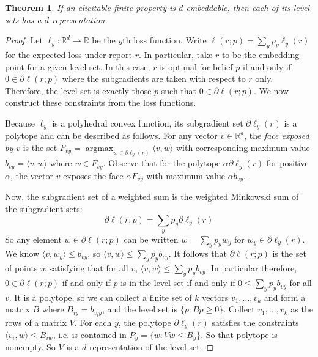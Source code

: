 \documentclass[12pt]{article}
\newtheorem{theorem}{Theorem}
\theoremstyle{definition}
\DeclareMathOperator*{\argmax}{\textrm{argmax}}
\newcommand{\reals}{\mathbb{R}}
\begin{document}
\begin{theorem}
  If an elicitable finite property is $d$-embeddable, then each of its level sets has a $d$-representation.
\end{theorem}
\begin{proof}
  Let $\ell_y: \reals^d \to \reals$ be the $y$th loss function.
  Write $\ell(r;p) = \sum_y p_y \ell_y(r)$ for the expected loss under report $r$.
  In particular, take $r$ to be the embedding point for a given level set.
  In this case, $r$ is optimal for belief $p$ if and only if $0 \in \partial \ell(r;p)$ where the subgradients are taken with respect to $r$ only.
  Therefore, the level set is exactly those $p$ such that $0 \in \partial \ell(r;p)$.
  We now construct these constraints from the loss functions.

  Because $\ell_y$ is a polyhedral convex function, its subgradient set $\partial \ell_y(r)$ is a polytope and can be described as follows.
  For any vector $v \in \reals^d$, the \emph{face exposed by $v$} is the set $F_{vy} = \argmax_{w \in \partial \ell_y(r)} \langle v, w \rangle$ with corresponding maximum value $b_{vy} = \langle v, w \rangle$ where $w \in F_{vy}$.
  Observe that for the polytope $\alpha \partial \ell_y(r)$ for positive $\alpha$, the vector $v$ exposes the face $\alpha F_{vy}$ with maximum value $\alpha b_{vy}$.

  Now, the subgradient set of a weighted sum is the weighted Minkowski sum of the subgradient sets:
    \[ \partial \ell(r;p) = \sum_y p_y \partial \ell_y(r) \]
  So any element $w \in \partial \ell(r;p)$ can be written $w = \sum_y p_y w_y$ for $w_y \in \partial \ell_y(r)$.
  We know $\langle v , w_y \rangle \leq b_{vy}$, so $\langle v, w \rangle \leq \sum_y p_y b_{vy}$.
  It follows that $\partial \ell(r;p)$ is the set of points $w$ satisfying that for all $v$, $\langle v,w \rangle \leq \sum_y p_y b_{vy}$.
  In particular therefore, $0 \in \partial \ell(r;p)$ if and only if $p$ is in the level set if and only if $0 \leq \sum_y p_y b_{vy}$ for all $v$.
  It is a polytope, so we can collect a finite set of $k$ vectors $v_1,\dots,v_k$ and form a matrix $B$ where $B_{iy} = b_{v_iy}$, and the level set is $\{p : B p \geq 0 \}$.
  Collect $v_1,\dots,v_k$ as the rows of a matrix $V$.
  For each $y$, the polytope $\partial \ell_y(r)$ satisfies the constraints $\langle v_i,w\rangle \leq B_{iw}$, i.e. is contained in $P_y = \{ w : Vw \leq B_y\}$.
  So that polytope is nonempty.
  So $V$ is a $d$-representation of the level set.
\end{proof}
\end{document}
